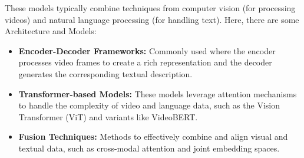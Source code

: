 \noindent These models typically combine techniques from computer vision (for processing videos) and natural language processing (for handling text). Here, there are some Architecture and Models:

\begin{itemize}
\item \textbf{Encoder-Decoder Frameworks:} Commonly used where the encoder processes video frames to create a rich representation and the decoder generates the corresponding textual description.
\item \textbf{Transformer-based Models:} These models leverage attention mechanisms to handle the complexity of video and language data, such as the Vision Transformer (ViT) and variants like VideoBERT.
\item \textbf{Fusion Techniques:} Methods to effectively combine and align visual and textual data, such as cross-modal attention and joint embedding spaces.
\end{itemize}